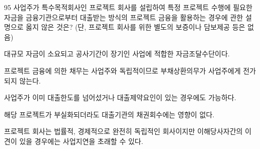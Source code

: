 \begin{question}{95}
사업주가 특수목적회사인 프로젝트 회사를 설립하여 특정 프로젝트 수행에 필요한 자금을 금융기관으로부터 대출받는 방식의 프로젝트 금융을 활용하는 경우에 관한 설명으로 옳지 않은 것은? (단, 프로젝트 회사를 위한 별도의 보증이나 담보제공 등은 없음)
\begin{choices}
  \item 대규모 자금이 소요되고 공사기간이 장기인 사업에 적합한 자금조달수단이다.
  \item 프로젝트 금융에 의한 채무는 사업주와 독립적이므로 부채상환의무가 사업주에게 전가되지 않는다.
  \item 사업주가 이미 대출한도를 넘어섰거나 대출제약요인이 있는 경우에도 가능하다.
  \item 해당 프로젝트가 부실화되더라도 대출기관의 채권회수에는 영향이 없다.
  \item 프로젝트 회사는 법률적, 경제적으로 완전히 독립적인 회사이지만 이해당사자간의 이견이 있을 경우에는 사업지연을 초래할 수 있다.
\end{choices}
\end{question}
